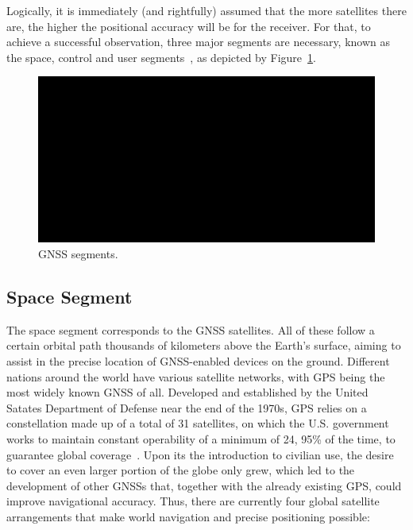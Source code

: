 Logically, it is immediately (and rightfully) assumed that the more satellites there are, the higher the positional accuracy will be for the receiver. For that, to achieve a successful observation, three major segments are necessary, known as the space, control and user segments~\cite{gps_USGov,novatel_gnss,ayers_geosystems_2011}, as depicted by Figure~\ref{fig:s_c_u_segment}.

\begin{figure}[ht]
	\centering
	\includegraphics[width=1.0\textwidth]{Chapters/Figures/demo.png}
	\caption{GNSS segments.}
	\label{fig:s_c_u_segment}
\end{figure}

\subsection{Space Segment}\label{sec:II_gnss_space_seg}

The space segment corresponds to the GNSS satellites. All of these follow a certain orbital path thousands of kilometers above the Earth's surface, aiming to assist in the precise location of GNSS-enabled devices on the ground.
Different nations around the world have various satellite networks, with GPS being the most widely known GNSS of all. Developed and established by the United Satates Department of Defense near the end of the 1970s, GPS relies on a constellation made up of a total of 31 satellites, on which the U.S. government works to maintain constant operability of a minimum of 24, 95\% of the time, to guarantee global coverage~\cite{gps_USGov}.
Upon its the introduction to civilian use, the desire to cover an even larger portion of the globe only grew, which led to the development of other GNSSs that, together with the already existing GPS, could improve navigational accuracy. Thus, there are currently four global satellite arrangements that make world navigation and precise positioning possible:

